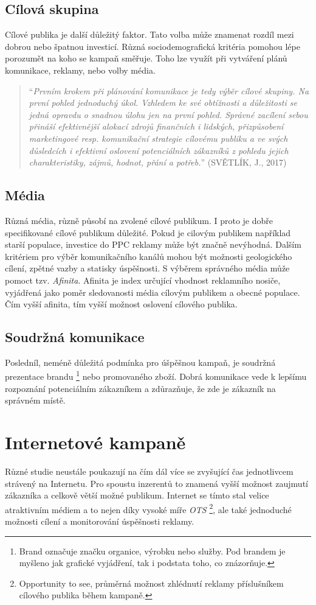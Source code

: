 \subsection{Cílová skupina}
Cílové publika je další důležitý faktor. Tato volba může znamenat rozdíl mezi dobrou nebo špatnou investicí. Různá sociodemografická kritéria pomohou lépe porozumět
na koho se kampaň směřuje. Toho lze využít při vytváření plánů komunikace, reklamy, nebo volby média.
\begin{quote}
    \enquote{\emph{Prvním krokem
    při plánování komunikace je tedy výběr cílové skupiny. Na první pohled jednoduchý úkol. Vzhledem
    ke své obtížnosti a důležitosti se jedná opravdu o snadnou úlohu jen na první pohled. Správné zacílení
    sebou přináší efektivnější alokací zdrojů finančních i lidských, přizpůsobení marketingové resp.
    komunikační strategie cílovému publiku a ve svých důsledcích i efektivní oslovení potenciálních
    zákazníků z pohledu jejich charakteristiky, zájmů, hodnot, přání a potřeb.}} (SVĚTLÍK, J., 2017) \cite{svetlik:reklama}
\end{quote}

\subsection{Média}
Různá média, různě působí na zvolené cílové publikum. I proto je dobře specifikované cílové publikum důležité. Pokud je cilovým publikem například starší populace, investice
do PPC reklamy může být značně nevýhodná. Dalším kritériem pro výběr komunikačního kanálů mohou být možnosti geologického cílení, zpětné vazby a statisky úspěšnosti.
S výběrem správného média může pomoct tzv. \emph{Afinita}. Afinita je index určující vhodnost reklamního nosiče, vyjádřená jako poměr sledovanosti média cílovým publikem
a obecné populace. Čím vyšší afinita, tím vyšší možnost oslovení cílového publika.

\subsection{Soudržná komunikace}
Posledníl, neméně důležitá podmínka pro úšpěšnou kampaň, je soudržná prezentace brandu
\footnote{Brand označuje značku organice, výrobku nebo služby. Pod brandem je myšleno jak grafické vyjádření, tak i podstata toho, co znázorňuje.}
nebo promovaného zboží. Dobrá komunikace vede k lepšímu rozpoznání potenciálním zákazníkem a zdůrazňuje, že zde je zákazník na správném místě.

\section{Internetové kampaně}
Různé studie neustále poukazují na čím dál více se zvyšující čas jednotlivcem strávený na Internetu. Pro spoustu inzerentů to znamená vyšší možnost
zaujmutí zákazníka a celkově větší možné publikum. Internet se tímto stal velice atraktivním médiem a to nejen díky vysoké míře \emph{OTS}
\footnote{Opportunity to see, průměrná možnost zhlédnutí reklamy příslušníkem cílového publika během kampaně.},
ale také jednoduché možnosti cílení a monitorování úspěšnosti reklamy.


